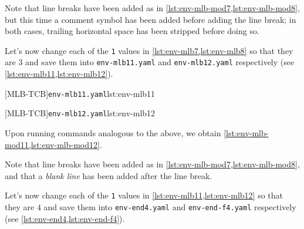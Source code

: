 		Note that line breaks have been added as in \cref{lst:env-mlb-mod7,lst:env-mlb-mod8}, but
		this time a comment symbol has been added before adding the line break; in both cases,
		trailing horizontal space has been stripped before doing so.

		Let's  now change each
		of the \texttt{1} values in \cref{lst:env-mlb7,lst:env-mlb8} so that they are $3$ and
		save them into \texttt{env-mlb11.yaml} and \texttt{env-mlb12.yaml} respectively (see
		\cref{lst:env-mlb11,lst:env-mlb12}). %

		\begin{minipage}{.49\textwidth}
			{\texttt{env-mlb11.yaml}}{lst:env-mlb11}
		\end{minipage}
		\hfill
		\begin{minipage}{.49\textwidth}
			{\texttt{env-mlb12.yaml}}{lst:env-mlb12}
		\end{minipage}

		Upon running commands analogous to the above, we obtain
		\cref{lst:env-mlb-mod11,lst:env-mlb-mod12}.

		\begin{widepage}
			\begin{minipage}{.42\linewidth}
			\end{minipage}
			\hfill
			\begin{minipage}{.57\linewidth}
			\end{minipage}
		\end{widepage}

		Note that line breaks have been added as in \cref{lst:env-mlb-mod7,lst:env-mlb-mod8}, and
		that a \emph{blank line} has been added after the line break.

		Let's now change  each
		of the \texttt{1} values in \cref{lst:env-mlb11,lst:env-mlb12} so that they are $4$ and
		save them into \texttt{env-end4.yaml} and \texttt{env-end-f4.yaml} respectively (see
		\cref{lst:env-end4,lst:env-end-f4}). %

